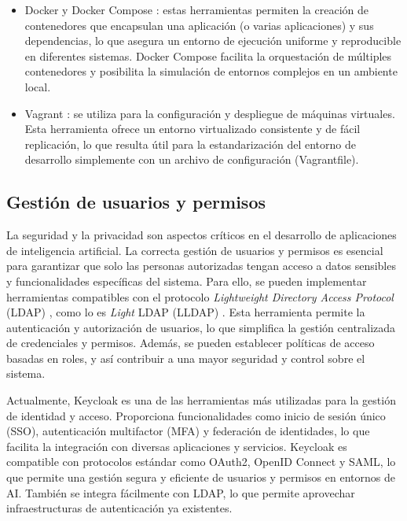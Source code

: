 \begin{itemize}
	\item Docker y Docker Compose \citep{merkel_docker_2014} \citep{docker_docker_nodate}: estas herramientas permiten la creación de contenedores que encapsulan una aplicación (o varias aplicaciones) y sus dependencias, lo que asegura un entorno de ejecución uniforme y reproducible en diferentes sistemas. Docker Compose facilita la orquestación de múltiples contenedores y posibilita la simulación de entornos complejos en un ambiente local.
	\item Vagrant \citep{hashicorp_vagrant_nodate} \citep{hashicorp_documentation_nodate}: se utiliza para la configuración y despliegue de máquinas virtuales. Esta herramienta ofrece un entorno virtualizado consistente y de fácil replicación, lo que resulta útil para la estandarización del entorno de desarrollo simplemente con un archivo de configuración (Vagrantfile).
\end{itemize}

\subsection{Gestión de usuarios y permisos}

La seguridad y la privacidad son aspectos críticos en el desarrollo de aplicaciones de inteligencia artificial. La correcta gestión de usuarios y permisos es esencial para garantizar que solo las personas autorizadas tengan acceso a datos sensibles y funcionalidades específicas del sistema. Para ello, se pueden implementar herramientas compatibles con el protocolo \textit{Lightweight Directory Access Protocol} (LDAP) \citep{wikipedia_protocolo_2024}, como lo es \textit{Light} LDAP (LLDAP) \citep{lldap_project_lldap_nodate}. Esta herramienta permite la autenticación y autorización de usuarios, lo que simplifica la gestión centralizada de credenciales y permisos. Además, se pueden establecer políticas de acceso basadas en roles, y así contribuir a una mayor seguridad y control sobre el sistema.

Actualmente, Keycloak \citep{cloud_native_computing_foundation_keycloak_nodate} es una de las herramientas más utilizadas para la gestión de identidad y acceso. Proporciona funcionalidades como inicio de sesión único (SSO), autenticación multifactor (MFA) y federación de identidades, lo que facilita la integración con diversas aplicaciones y servicios. Keycloak es compatible con protocolos estándar como OAuth2, OpenID Connect y SAML, lo que permite una gestión segura y eficiente de usuarios y permisos en entornos de AI. También se integra fácilmente con LDAP, lo que permite aprovechar infraestructuras de autenticación ya existentes.

